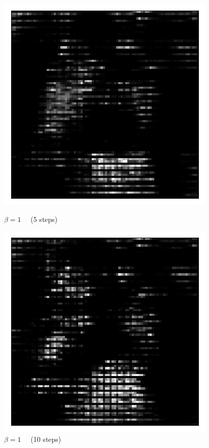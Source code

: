 \begin{figure}[h!]
\begin{multicols}{4}
    \includegraphics[scale=0.4]{figures/results/naive_average/beta_1_posterior_sample_5.png}
    \caption{$\beta=1\quad$ (5 steps)}
    \includegraphics[scale=0.4]{figures/results/naive_average/beta_1_posterior_sample_10.png}
    \caption{$\beta=1\quad$ (10 steps)}
\end{multicols}


\end{figure}
